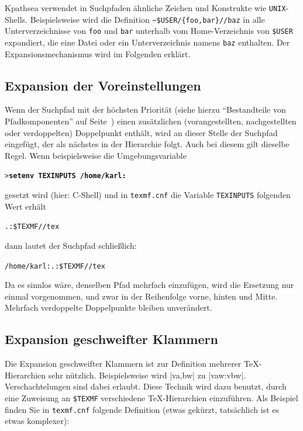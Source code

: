 \documentclass[12pt,ngerman,a4paper,fullparskip]{report}
\newcommand{\acro}[1]{\texttt{#1}}
\newcommand{\code}[1]{\texttt{#1}}
\newcommand{\file}[1]{\texttt{#1}}
\newcommand{\dirname}[1]{\texttt{#1}}
\newcommand{\KPS}{Kpathsea\xspace}
\newcommand{\Ucom}[1]{\textbf{\texttt{#1}}}
\begin{document}
{\KPS} verwendet in Suchpfaden ähnliche Zeichen und Konstrukte wie
\acro{UNIX}-Shells. Beispielsweise wird die Definition
\verb|~$USER/{foo,bar}//baz| in alle Unterverzeichnisse von \file{foo} und
\file{bar} unterhalb vom Home-Verzeichnis von \dirname{\$USER} expandiert,
die eine Datei oder ein Unterverzeichnis namens \file{baz} enthalten. Der
Expansionsmechanismus wird im Folgenden erklärt.

\subsection{Expansion der Voreinstellungen}\label{sec:default-expansion}

Wenn der Suchpfad mit der höchsten Priorität (siehe hierzu \enquote{Bestandteile von
Pfadkomponenten} auf Seite~\pageref{sec:path-sources}) einen zusätzlichen
(vorangestellten, nachgestellten oder verdoppelten) Doppelpunkt enthält,
wird an dieser Stelle der Suchpfad eingefügt, der als nächstes in der
Hierarchie folgt. Auch bei diesem gilt dieselbe Regel. Wenn beispielsweise
die Umgebungsvariable


\begin{alltt}
> \Ucom{setenv TEXINPUTS /home/karl:}
\end{alltt}

gesetzt wird (hier: C-Shell) und in \file{texmf.cnf} die Variable
\code{TEXINPUTS} folgenden Wert erhält

\begin{alltt}
  .:\$TEXMF//tex
\end{alltt}

dann lautet der Suchpfad schließlich:

\begin{alltt}
  /home/karl:.:\$TEXMF//tex
\end{alltt}

Da es sinnlos wäre, denselben Pfad mehrfach einzufügen, wird die Ersetzung
nur einmal vorgenommen, und zwar in der Reihenfolge vorne, hinten und
Mitte. Mehrfach verdoppelte Doppelpunkte bleiben unverändert.

\subsection{Expansion geschweifter Klammern}

Die Expansion geschweifter Klammern ist zur Definition mehrerer \TeX-Hierarchien sehr nützlich. Beispielsweise wird |v{a,b}w| zu |vaw:vbw|. Verschachtelungen sind dabei erlaubt. Diese Technik wird dazu benutzt, durch eine Zuweisung an
\code{\$TEXMF} verschiedene \TeX-Hierarchien einzuführen. Als Beispiel finden Sie in \file{texmf.cnf} folgende Definition (etwas gekürzt, tatsächlich ist es etwas komplexer):
\end{document}

